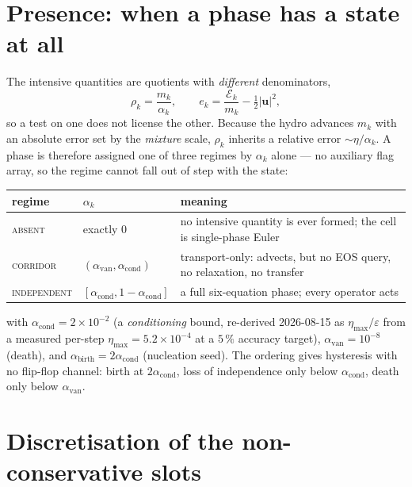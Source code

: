 \documentclass[11pt,a4paper]{article}
\newcommand{\uvec}{\mathbf{u}}
\begin{document}
\section{Presence: when a phase has a state at all}

The intensive quantities are quotients with \emph{different} denominators,
\begin{equation}
  \rho_k = \frac{m_k}{\alpha_k},
  \qquad
  e_k = \frac{\mathcal{E}_k}{m_k} - \tfrac12|\uvec|^2,
\end{equation}
so a test on one does not license the other.  Because the hydro advances $m_k$
with an absolute error set by the \emph{mixture} scale, $\rho_k$ inherits a
relative error $\sim\eta/\alpha_k$.  A phase is therefore assigned one of three
regimes by $\alpha_k$ alone --- no auxiliary flag array, so the regime cannot
fall out of step with the state:

\begin{center}
\begin{tabular}{@{}lll@{}}
\toprule
regime & $\alpha_k$ & meaning \\
\midrule
\textsc{absent} & exactly $0$
  & no intensive quantity is ever formed; the cell is single-phase Euler \\
\textsc{corridor} & $(\alpha_{\mathrm{van}},\alpha_{\mathrm{cond}})$
  & transport-only: advects, but no EOS query, no relaxation, no transfer \\
\textsc{independent} & $[\alpha_{\mathrm{cond}},1-\alpha_{\mathrm{cond}}]$
  & a full six-equation phase; every operator acts \\
\bottomrule
\end{tabular}
\end{center}

\noindent
with
$\alpha_{\mathrm{cond}}=2\times10^{-2}$ (a \emph{conditioning} bound, re-derived 2026-08-15 as
$\eta_{\max}/\varepsilon$ from a measured per-step $\eta_{\max}=5.2\times10^{-4}$
at a $5\,\%$ accuracy target), $\alpha_{\mathrm{van}}=10^{-8}$ (death), and
$\alpha_{\mathrm{birth}}=2\alpha_{\mathrm{cond}}$ (nucleation seed).  The
ordering gives hysteresis with no flip-flop channel: birth at
$2\alpha_{\mathrm{cond}}$, loss of independence only below
$\alpha_{\mathrm{cond}}$, death only below $\alpha_{\mathrm{van}}$.

\section{Discretisation of the non-conservative slots}
\label{sec:disc}
\end{document}

